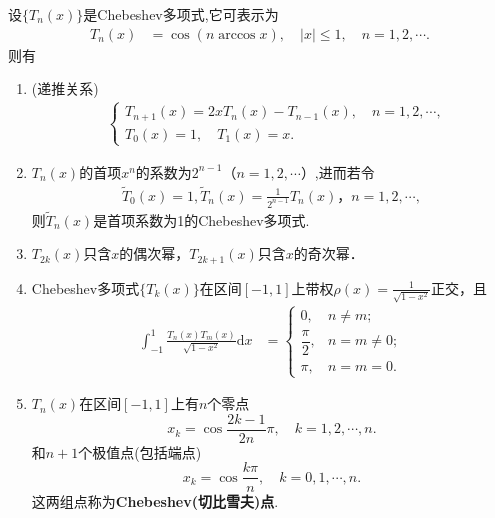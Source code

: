 \documentclass[../../main.tex]{subfiles}
\begin{document}
\begin{theorem}[Chebeshev多项式的性质]\label{theorem:Chebeshev多项式的性质}
设$\{T_n(x)\}$是Chebeshev多项式,它可表示为
\begin{align*}
T_n(x) &= \cos(n \arccos x),\quad |x| \leqslant 1,\quad n=1,2,\cdots.
\end{align*}
则有
\begin{enumerate}
\item (递推关系)
\begin{align}\label{eq:数值分析-3-2.11}
&\begin{cases}
T_{n+1}(x) = 2xT_n(x) - T_{n-1}(x),\quad n = 1,2,\cdots, \\
T_0(x) = 1,\quad T_1(x) = x.
\end{cases}
\end{align}

\item $T_n(x)$的首项$x^n$的系数为$2^{n-1}$（$n=1,2,\cdots$）,进而若令
\begin{align*}
\widetilde{T}_0(x) = 1,\widetilde{T}_n(x) = \frac{1}{2^{n-1}}T_n(x)，n=1,2,\cdots,
\end{align*}
则$\widetilde{T}_n(x)$是首项系数为1的Chebeshev多项式.

\item $T_{2k}(x)$只含$x$的偶次幂，$T_{2k+1}(x)$只含$x$的奇次幂．

\item Chebeshev多项式$\{T_k(x)\}$在区间$[-1,1]$上带权$\rho(x) = \frac{1}{\sqrt{1 - x^2}}$正交，且
\begin{align}\label{eq:数值分析-3-2.12}
\int_{-1}^1 \frac{T_n(x)T_m(x)}{\sqrt{1 - x^2}}\mathrm{d}x &=
\begin{cases}
0, & n \neq m; \\
\dfrac{\pi}{2}, & n = m \neq 0; \\
\pi, & n = m = 0.
\end{cases}
\end{align}

\item $T_n(x)$在区间$[-1,1]$上有$n$个零点
$$x_k = \cos\frac{2k - 1}{2n}\pi,\quad k = 1,2,\cdots,n.$$
和$n+1$个极值点(包括端点)
$$x_k = \cos\frac{k\pi}{n},\quad k = 0,1,\cdots,n.$$
这两组点称为\textbf{Chebeshev(切比雪夫)点}.
\end{enumerate}
\end{theorem}
\end{document}
